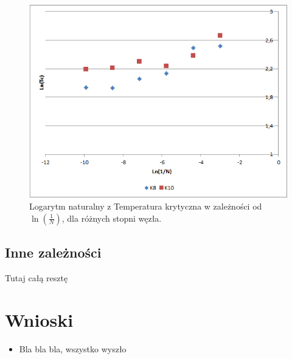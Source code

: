 \documentclass[12pt,a4paper]{article}
\begin{document}
\begin{figure}
\includegraphics[width=\textwidth]{LNK8K10.png}
\caption{Logarytm naturalny z Temperatura krytyczna w zależności od $\ln(\frac{1}{N})$, dla różnych stopni węzła.}
\label{fig:LnTcOd1/N.2}
\end{figure}

\subsection{Inne zależności}
Tutaj całą resztę

\section{Wnioski}
\begin{itemize}
\item Bla bla bla, wszystko wyszło
\end{itemize}
\end{document}
